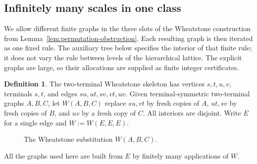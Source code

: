 \documentclass[scheme=plain,11pt]{ctexart}
\theoremstyle{definition}
\newtheorem{definition}[theorem]{Definition}
\theoremstyle{remark}
\begin{document}
\subsection{Infinitely many scales in one class}\label{sec:incommensurate-family}\label{sec:transcendental-dependence}
We allow different finite graphs in the three slots of the Wheatstone construction from Lemma~\ref{lem:permutation-obstruction}. Each resulting graph is then iterated as one fixed rule. The auxiliary tree below specifies the interior of that finite rule; it does not vary the rule between levels of the hierarchical lattice. The explicit graphs are large, so their allocations are supplied as finite integer certificates.

\begin{definition}\label{def:wheatstone}
The two-terminal Wheatstone skeleton has vertices $s,t,u,v$, terminals $s,t$, and edges $su,ut,sv,vt,uv$. Given terminal-symmetric two-terminal graphs $A,B,C$, let $W(A,B,C)$ replace $su,vt$ by fresh copies of $A$, $ut,sv$ by fresh copies of $B$, and $uv$ by a fresh copy of $C$. All interiors are disjoint. Write $E$ for a single edge and $W:=W(E,E,E)$.
\end{definition}

\begin{figure}[tbp]
\centering
{}
\caption{The Wheatstone substitution $W(A,B,C)$.}
\label{fig:wheatstone}
\end{figure}


All the graphs used here are built from $E$ by finitely many applications of $W$.
\end{document}
